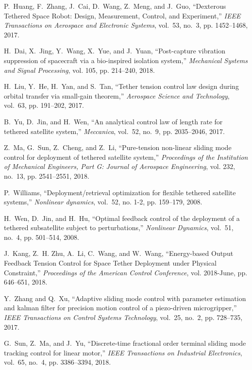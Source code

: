 \documentclass[10pt,final,journal]{IEEEtran}
\begin{document}
\begin{thebibliography}{10}
	P.~Huang, F.~Zhang, J.~Cai, D.~Wang, Z.~Meng, and J.~Guo, ``{Dexterous Tethered
		Space Robot: Design, Measurement, Control, and Experiment},'' \emph{IEEE
		Transactions on Aerospace and Electronic Systems}, vol.~53, no.~3, pp.
		1452--1468, 2017.
	
	H.~Dai, X.~Jing, Y.~Wang, X.~Yue, and J.~Yuan, ``Post-capture vibration
		suppression of spacecraft via a bio-inspired isolation system,''
		\emph{Mechanical Systems and Signal Processing}, vol. 105, pp. 214--240,
		2018.
	
	H.~Liu, Y.~He, H.~Yan, and S.~Tan, ``Tether tension control law design during
		orbital transfer via small-gain theorem,'' \emph{Aerospace Science and
		Technology}, vol.~63, pp. 191--202, 2017.
	
	B.~Yu, D.~Jin, and H.~Wen, ``An analytical control law of length rate for
		tethered satellite system,'' \emph{Meccanica}, vol.~52, no.~9, pp.
		2035--2046, 2017.
	
	Z.~Ma, G.~Sun, Z.~Cheng, and Z.~Li, ``Pure-tension non-linear sliding mode
		control for deployment of tethered satellite system,'' \emph{Proceedings of
		the Institution of Mechanical Engineers, Part G: Journal of Aerospace
		Engineering}, vol. 232, no.~13, pp. 2541--2551, 2018.
	
	P.~Williams, ``Deployment/retrieval optimization for flexible tethered
		satellite systems,'' \emph{Nonlinear dynamics}, vol.~52, no. 1-2, pp.
		159--179, 2008.
	
	H.~Wen, D.~Jin, and H.~Hu, ``Optimal feedback control of the deployment of a
		tethered subsatellite subject to perturbations,'' \emph{Nonlinear Dynamics},
		vol.~51, no.~4, pp. 501--514, 2008.
	
	J.~Kang, Z.~H. Zhu, A.~Li, C.~Wang, and W.~Wang, ``{Energy-based Output
		Feedback Tension Control for Space Tether Deployment under Physical
		Constraint},'' \emph{Proceedings of the American Control Conference}, vol.
		2018-June, pp. 646--651, 2018.
	
	Y.~Zhang and Q.~Xu, ``Adaptive sliding mode control with parameter estimation
		and kalman filter for precision motion control of a piezo-driven
		microgripper,'' \emph{IEEE Transactions on Control Systems Technology},
		vol.~25, no.~2, pp. 728--735, 2017.
	
	G.~Sun, Z.~Ma, and J.~Yu, ``Discrete-time fractional order terminal sliding
		mode tracking control for linear motor,'' \emph{IEEE Transactions on
		Industrial Electronics}, vol.~65, no.~4, pp. 3386--3394, 2018.
	

\end{thebibliography}
\end{document}
